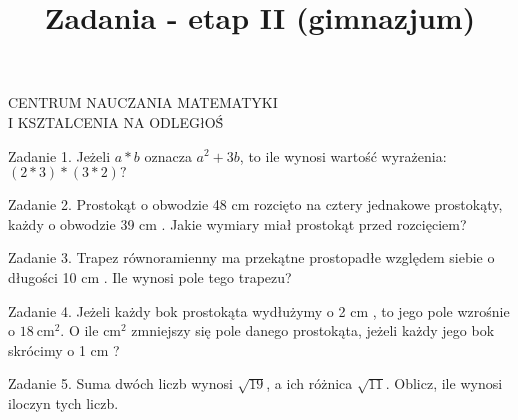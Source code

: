 \documentclass[10pt]{article}
\title{Zadania - etap II (gimnazjum) }
\author{}
\date{}
\begin{document}
\maketitle
CENTRUM NAUCZANIA MATEMATYKI\\
I KSZTALCENIA NA ODLEGłOŚ́

Zadanie 1. Jeżeli \(a * b\) oznacza \(a^{2}+3 b\), to ile wynosi wartość wyrażenia: \((2 * 3) *(3 * 2) ?\)

Zadanie 2. Prostokąt o obwodzie 48 cm rozcięto na cztery jednakowe prostokąty, każdy o obwodzie 39 cm . Jakie wymiary miał prostokąt przed rozcięciem?

Zadanie 3. Trapez równoramienny ma przekątne prostopadłe względem siebie o długości 10 cm . Ile wynosi pole tego trapezu?

Zadanie 4. Jeżeli każdy bok prostokąta wydłużymy o 2 cm , to jego pole wzrośnie o \(18 \mathrm{~cm}^{2}\). O ile \(\mathrm{cm}^{2}\) zmniejszy się pole danego prostokąta, jeżeli każdy jego bok skrócimy o 1 cm ?

Zadanie 5. Suma dwóch liczb wynosi \(\sqrt{19}\), a ich różnica \(\sqrt{11}\). Oblicz, ile wynosi iloczyn tych liczb.
\end{document}
